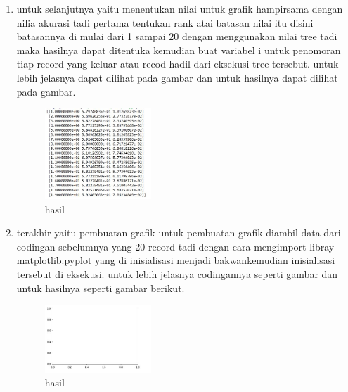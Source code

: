 \begin{enumerate}
\item untuk selanjutnya yaitu menentukan nilai untuk grafik hampirsama dengan nilia akurasi tadi pertama tentukan rank atai batasan nilai itu disini batasannya di mulai dari 1 sampai 20 dengan menggunakan nilai tree tadi maka hasilnya dapat ditentuka kemudian buat variabel i untuk penomoran tiap record yang keluar atau recod hadil dari eksekusi tree tersebut. untuk lebih jelasnya dapat dilihat pada gambar dan untuk hasilnya dapat dilihat pada gambar.

\begin{figure}[H]
\centering
\includegraphics[width= 4cm]{figures/1174039/chapter2/17.JPG}
\caption{hasil}

\end{figure}


\item terakhir yaitu pembuatan grafik untuk pembuatan grafik diambil data dari codingan sebelumnya yang 20 record tadi dengan cara mengimport libray matplotlib.pyplot yang di inisialisasi menjadi bakwankemudian inisialisasi tersebut di eksekusi. untuk lebih jelasnya codingannya seperti gambar dan untuk hasilnya seperti gambar  berikut. 

\begin{figure}[H]
\centering
\includegraphics[width= 4cm]{figures/1174039/chapter2/18.JPG}
\caption{hasil}

\end{figure}
\end{enumerate}

